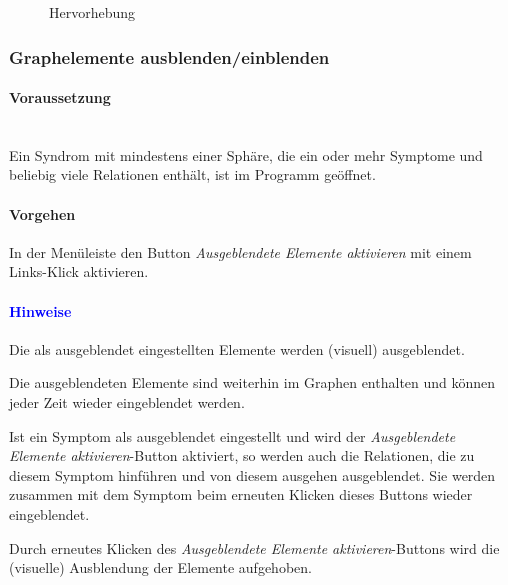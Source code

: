 \documentclass[enabledeprecatedfontcommands,fontsize=11pt,paper=a4,twoside]{scrartcl}
\newcounter{one}
\newcounter{two}[one]
\newcommand*{\hint}{\paragraph{\textcolor{blue}{Hinweise}}}
\newcommand*{\condition}{\paragraph{Voraussetzung}$\;$ \vspace{0.2cm}\\}
\newcommand*{\action}{\paragraph{Vorgehen}}
\let\tempone\itemize
\let\temptwo\enditemize
\renewenvironment{itemize}{\tempone\addtolength{\itemsep}{-10.0pt}}{\temptwo}
\let\origenumerate\enumerate
\let\origendenumerate\endenumerate
\renewenvironment{enumerate}{\origenumerate \addtolength{\itemsep}{-10.0pt}}{\origendenumerate}
\begin{document}
\begin{figure}[ht!]
	\centering
	\caption{Hervorhebung}
	
\end{figure}

\subsubsection{Graphelemente ausblenden/einblenden}
		\condition 	
		Ein Syndrom mit mindestens einer Sphäre, die ein oder mehr Symptome und beliebig viele Relationen enthält, ist im Programm geöffnet.
		\action
			\begin{enumerate}
				\item In der Menüleiste den Button \textit{Ausgeblendete Elemente aktivieren} mit einem Links-Klick aktivieren.
			\end{enumerate}
		\hint
		\begin{itemize}
				\item Die als ausgeblendet eingestellten Elemente werden (visuell) ausgeblendet. 
				\item Die ausgeblendeten Elemente sind weiterhin im Graphen enthalten und können jeder Zeit wieder eingeblendet werden. 
				\item Ist ein Symptom als ausgeblendet eingestellt und wird der \textit{Ausgeblendete Elemente aktivieren}-Button aktiviert, so werden auch die Relationen, die zu diesem Symptom hinführen und von diesem ausgehen ausgeblendet. Sie werden zusammen mit dem Symptom beim erneuten Klicken dieses Buttons wieder eingeblendet.
				\item Durch erneutes Klicken des \textit{Ausgeblendete Elemente aktivieren}-Buttons wird die (visuelle) Ausblendung der Elemente aufgehoben. \\
		\end{itemize}
		
\end{document}
